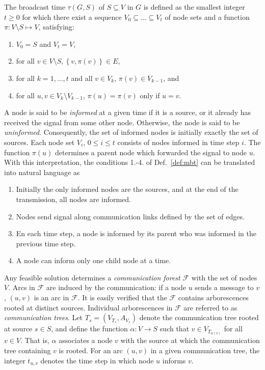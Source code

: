 \begin{definition}\label{def:mbt}
The broadcast time $\tau(G,S)$ of $S\subseteq V$ in $G$ is defined as the smallest integer $t\geq 0$
for which there exist a sequence $V_0\subseteq\dots\subseteq V_t$ of node sets and a function $\pi:V\setminus S\mapsto V$, satisfying:
\begin{enumerate}
\item $V_0=S$ and $V_t=V$,
\item for all $v\in V\setminus S, \left\{v,\pi(v)\right\}\in E$,
\item for all $k=1,\dots,t$ and all $v\in V_k$, $\pi(v)\in V_{k-1}$, and
\item for all $u,v\in V_k\setminus V_{k-1}$, $\pi(u)=\pi(v)$ only if $u=v$.
\end{enumerate}
\end{definition}
A node is said to be \emph{informed} at a given time if it is a source, or it already has received the signal from some other node. Otherwise, the node is said to be \emph{uninformed}.
Consequently, the set of informed nodes is initially exactly the set of sources.
Each node set $V_i$, $0\leq i\leq t$ consists of nodes informed in time step $i$.
The function $\pi(u)$ determines a parent node which forwarded the signal to node $u$.
With this interpretation, the conditions 1.-4. of Def.~\ref{def:mbt} can be translated into natural language as 
\begin{enumerate}
\item Initially the only informed nodes are the sources, and at the end of the transmission, all nodes are informed.
\item Nodes send signal along communication links defined by the set of edges.
\item En each time step, a node is informed by its parent who was informed in the previous time step.
\item A node can inform only one child node at a time.
\end{enumerate}

Any feasible solution determines a \emph{communication forest} $\mathcal{F}$ with the set of nodes $V$.
Arcs in $\mathcal{F}$ are induced by the communication: if a node $u$ sends a message to $v$, $(u,v)$ is an arc in $\mathcal{F}$.
It is easily verified that the $\mathcal{F}$ contains arborescences rooted at distinct sources.
Individual arborescences in $\mathcal{F}$ are referred to as \emph{communication trees}.
Let $T_s=\left(V_{T_s},A_{V_s}\right)$ denote the communication tree rooted at source $s\in S$, and define the function $\alpha:V\to S$ such that $v\in V_{T_{\alpha(v)}}$ for all $v\in V$.
That is, $\alpha$ associates a node $v$ with the source at which the communication tree containing $v$ is rooted.
For an arc $(u,v)$ in a given communication tree, the integer $t_{u,v}$ denotes the time step in which node $u$ informs $v$.


